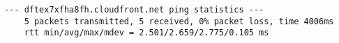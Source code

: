 \begin{parts}
\begin{solution}
\begin{Verbatim}[label={\$ ping www.uol.com.br -c 5}, fontsize=\small]
    --- dftex7xfha8fh.cloudfront.net ping statistics ---
    5 packets transmitted, 5 received, 0% packet loss, time 4006ms
    rtt min/avg/max/mdev = 2.501/2.659/2.775/0.105 ms
    \end{Verbatim}
  \end{solution}
\end{parts}